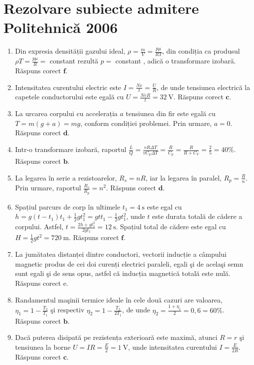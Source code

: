 \section*{Rezolvare subiecte admitere Politehnică 2006}
\begin{enumerate}
  \item Din expresia densității gazului ideal, $\rho=\frac{m}{V}=\frac{p \mu}{R T}$, din condiția ca produsul $\rho T=\frac{p \mu}{R}=$ constant rezultă $p=$ constant , adică o transformare izobară. Răspuns corect $\boldsymbol{f}$.
  \item Intensitatea curentului electric este $I=\frac{N e}{t}=\frac{U}{R}$, de unde tensiunea electrică la capetele conductorului este egală cu $U=\frac{N e R}{t}=32 \mathrm{~V}$. Răspuns corect $\boldsymbol{c}$.
  \item La urcarea corpului cu accelerația $a$ tensiunea din fir este egală cu $T=m(g+a)=m g$, conform condiției problemei. Prin urmare, $a=0$. Răspuns corect $\boldsymbol{d}$.
  \item Intr-o transformare izobară, raportul $\frac{L}{Q}=\frac{v R \Delta T}{v C_{p} \Delta T}=\frac{R}{C_{p}}=\frac{R}{R+C_{V}}=\frac{2}{5}=40 \%$. Răspuns corect $\boldsymbol{b}$.
  \item La legarea în serie a rezistoarelor, $R_{s}=n R$, iar la legarea în paralel, $R_{p}=\frac{R}{n}$. Prin urmare, raportul $\frac{R_{s}}{R_{p}}=n^{2}$. Răspuns corect $\boldsymbol{d}$.
  \item Spațiul parcurs de corp în ultimele $t_{1}=4 \mathrm{~s}$ este egal cu $h=g\left(t-t_{1}\right) t_{1}+\frac{1}{2} g t_{1}^{2}=g t t_{1}-\frac{1}{2} g t_{1}^{2}$, unde $t$ este durata totală de cădere a corpului. Astfel, $t=\frac{2 h+g t_{1}^{2}}{2 g t_{1}}=12 \mathrm{~s}$. Spațiul total de cădere este egal cu $H=\frac{1}{2} g t^{2}=720 \mathrm{~m}$. Răspuns corect $\boldsymbol{f}$.
  \item La jumătatea distanței dintre conductori, vectorii inducție a câmpului magnetic produs de cei doi curenți electrici paraleli, egali şi de acelaşi semn sunt egali şi de sens opus, astfel că inducția magnetică totală este nulă. Răspuns corect e.
  \item Randamentul maşinii termice ideale în cele două cazuri are valoarea, $\eta_{1}=1-\frac{T_{2}}{T_{1}}$ şi respectiv $\eta_{2}=1-\frac{T_{2}}{2 T_{1}}$, de unde $\eta_{2}=\frac{1+\eta_{1}}{2}=0,6=60 \%$. Răspuns corect $\boldsymbol{b}$.
  \item Dacă puterea disipată pe rezistența exterioară este maximă, atunci $R=r$ şi tensiunea la borne $U=I R=\frac{E}{2}=1 \mathrm{~V}$, unde intensitatea curentului $I=\frac{E}{2 R}$. Răspuns corect $\boldsymbol{c}$.

\end{enumerate}
